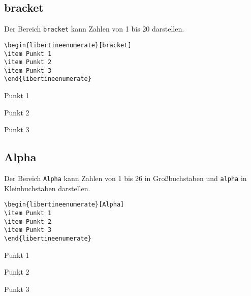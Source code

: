 \documentclass[ngerman]{libertinedoku}
\begin{document}
\subsection{bracket}

Der Bereich \texttt{bracket} kann Zahlen von 1 bis 20 darstellen.


\begin{minipage}{\linewidth}
\begin{minipage}{.48\linewidth}
\begin{lstlisting}
\begin{libertineenumerate}[bracket]
\item Punkt 1
\item Punkt 2
\item Punkt 3
\end{libertineenumerate}
\end{lstlisting}
\end{minipage}\hfill
\begin{minipage}{.48\linewidth}
\begin{libertineenumerate}[bracket]
\item Punkt 1
\item Punkt 2
\item Punkt 3
\end{libertineenumerate}
\end{minipage}
\end{minipage}

\subsection{Alpha}

Der Bereich \texttt{Alpha} kann Zahlen von 1 bis 26 in Großbuchstaben und
\texttt{alpha} in Kleinbuchstaben darstellen.




\begin{minipage}{\linewidth}
\begin{minipage}{.48\linewidth}
\begin{lstlisting}
\begin{libertineenumerate}[Alpha]
\item Punkt 1
\item Punkt 2
\item Punkt 3
\end{libertineenumerate}
\end{lstlisting}
\end{minipage}\hfill
\begin{minipage}{.48\linewidth}
\begin{libertineenumerate}[Alpha]
\item Punkt 1
\item Punkt 2
\item Punkt 3
\end{libertineenumerate}
\end{minipage}
\end{minipage}
\end{document}
